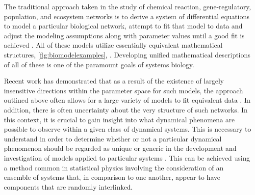 The traditional approach taken in the study of chemical reaction, gene-regulatory, population, and ecosystem networks is to derive a system of differential equations to model a particular biological network, attempt to fit that model to data and adjust the modeling assumptions along with parameter values until a good fit is achieved \cite{Meyer2014}. All of these models utilize essentially equivalent mathematical structures, \ref{fig:biomodelexamples}, \cite{RossCr2003,Palsson2011a,Sauro2012}. Developing unified mathematical descriptions of all of these is one of the paramount goals of systems biology.

Recent work has demonstrated that as a result of the existence of largely insensitive directions within the parameter space for such models, the approach outlined above often allows for a large variety of models to fit equivalent data \cite{Machta2013,Hines2014,Prabakaran2014,Tonsing2014}. In addition, there is often uncertainty about the very structure of such networks. In this context, it is crucial to gain insight into what dynamical phenomena are possible to observe within a given class of dynamical systems. This is necessary to understand in order to determine whether or not a particular dynamical phenomenon should be regarded as unique or generic in the development and investigation of models applied to particular systems \cite{Gunawardena2013,Gunawardena2014}. This can be achieved using a method common in statistical physics involving the consideration of an ensemble of systems that, in comparison to one another, appear to have components that are randomly interlinked.


